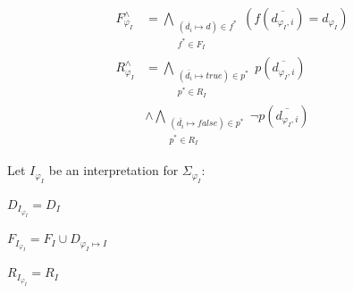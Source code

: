 \documentclass[letterpaper]{article}
\newenvironment{packed_itemize}{
\vspace*{-0.2em}
\begin{itemize}
\setlength{\partopsep}{0pt}
\setlength{\itemsep}{1pt}
\setlength{\parskip}{0pt}
\setlength{\parsep}{0pt}
}{\end{itemize}}
\newcommand{\true}{{\mathit{true}}}
\newcommand{\false}{{\mathit{false}}}
\begin{document}
\begin{packed_itemize}
\begin{equation*}
\begin{split}
F^\wedge_{\varphi_I} &= \bigwedge_{\substack{(\overline{d_i} \mapsto d) \in f^* \\ 
                                             f^* \in F_I}} ( f(\overline{d_{\varphi_I,i}}) = d_{\varphi_I} ) \\
R^\wedge_{\varphi_I} &= \bigwedge_{\substack{(\overline{d_i} \mapsto \true) \in p^* \\
                                             p^* \in R_I}} p(\overline{d_{\varphi_I,i}}) \\
                     &\wedge \bigwedge_{\substack{(\overline{d_i} \mapsto \false) \in p^* \\
                                             p^* \in R_I}} \neg p(\overline{d_{\varphi_I,i}})
\end{split}
\end{equation*}
\end{packed_itemize}

\noindent
Let $I_{\varphi_I}$ be an interpretation for $\Sigma_{\varphi_I}$:
\begin{packed_itemize}
\item $D_{I_{\varphi_I}} = D_I$
\item $F_{I_{\varphi_I}} = F_I \cup D_{\varphi_I \mapsto I}$
\item $R_{I_{\varphi_I}} = R_I$
\end{packed_itemize}
\end{document}
